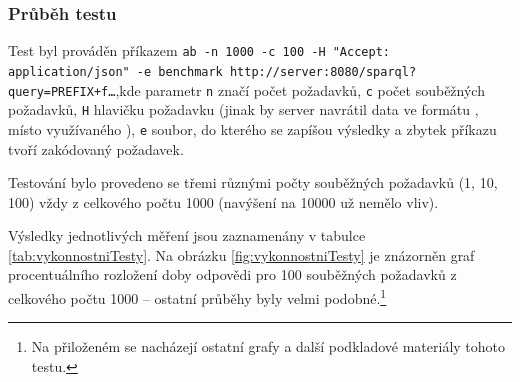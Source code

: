 
\subsubsection{Průběh testu}
Test byl prováděn příkazem \texttt{ab -n 1000 -c 100 -H "Accept: application\linebreak /json"\ -e benchmark http://server:8080/sparql?query=PREFIX+f\dots},\linebreak kde parametr \texttt{n} značí počet požadavků, \texttt{c} počet souběžných požadavků, \texttt{H} hlavičku požadavku (jinak by server navrátil data ve formátu , místo využívaného ), \texttt{e} soubor, do kterého se zapíšou výsledky a zbytek příkazu tvoří zakódovaný  požadavek.

Testování bylo provedeno se třemi různými počty souběžných požadavků (1, 10, 100) vždy z celkového počtu 1000 (navýšení na 10000 už nemělo vliv).

Výsledky jednotlivých měření jsou zaznamenány v tabulce \ref{tab:vykonnostniTesty}. Na obrázku \ref{fig:vykonnostniTesty} je znázorněn graf procentuálního rozložení doby odpovědi pro 100 souběžných požadavků z celkového počtu 1000 -- ostatní průběhy byly velmi podobné.\footnote{Na přiloženém  se nacházejí ostatní grafy a další podkladové materiály tohoto testu.}


